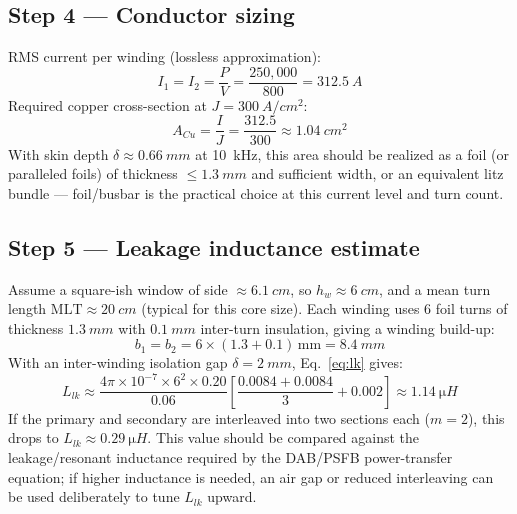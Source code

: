 \documentclass[11pt,a4paper]{article}
\begin{document}
\subsection*{Step 4 — Conductor sizing}
RMS current per winding (lossless approximation):
\begin{equation}
    I_1 = I_2 = \frac{P}{V} = \frac{250{,}000}{800} = \SI{312.5}{A}
\end{equation}
Required copper cross-section at $J=\SI{300}{A/cm^2}$:
\begin{equation}
    A_{Cu} = \frac{I}{J} = \frac{312.5}{300} \approx \SI{1.04}{cm^2}
\end{equation}
With skin depth $\delta \approx \SI{0.66}{mm}$ at \SI{10}{kHz}, this area should be
realized as a foil (or paralleled foils) of thickness $\le \SI{1.3}{mm}$ and
sufficient width, or an equivalent litz bundle — foil/busbar is the practical
choice at this current level and turn count.

\subsection*{Step 5 — Leakage inductance estimate}
Assume a square-ish window of side $\approx\SI{6.1}{cm}$, so $h_w \approx \SI{6}{cm}$,
and a mean turn length $\mathrm{MLT}\approx\SI{20}{cm}$ (typical for this core size).
Each winding uses 6 foil turns of thickness $\SI{1.3}{mm}$ with $\SI{0.1}{mm}$
inter-turn insulation, giving a winding build-up:
\begin{equation}
    b_1 = b_2 = 6\times(1.3+0.1)\,\text{mm} = \SI{8.4}{mm}
\end{equation}
With an inter-winding isolation gap $\delta = \SI{2}{mm}$, Eq.~\eqref{eq:lk} gives:
\begin{equation}
    L_{lk} \approx \frac{4\pi\times10^{-7} \times 6^2 \times 0.20}{0.06}
    \left[\frac{0.0084+0.0084}{3}+0.002\right] \approx \SI{1.14}{\micro H}
\end{equation}
If the primary and secondary are interleaved into two sections each ($m=2$),
this drops to $L_{lk}\approx\SI{0.29}{\micro H}$. This value should be compared
against the leakage/resonant inductance required by the DAB/PSFB power-transfer
equation; if higher inductance is needed, an air gap or reduced interleaving can
be used deliberately to tune $L_{lk}$ upward.
\end{document}
